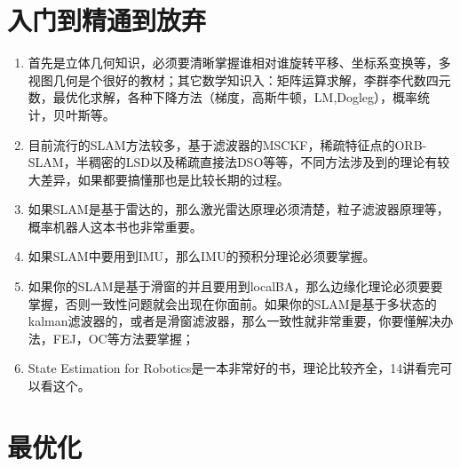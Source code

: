 \documentclass[]{elegantbook}
\author{龚正茂}
\date{\today}
\begin{document}
\maketitle
\tableofcontents  %
\mainmatter  		%


\chapter{入门到精通到放弃}

\begin{enumerate}
	\item 首先是立体几何知识，必须要清晰掌握谁相对谁旋转平移、坐标系变换等，多视图几何是个很好的教材；其它数学知识入：矩阵运算求解，李群李代数四元数，最优化求解，各种下降方法（梯度，高斯牛顿，LM,Dogleg），概率统计，贝叶斯等。
	\item 目前流行的SLAM方法较多，基于滤波器的MSCKF，稀疏特征点的ORB-SLAM，半稠密的LSD以及稀疏直接法DSO等等，不同方法涉及到的理论有较大差异，如果都要搞懂那也是比较长期的过程。
	\item 如果SLAM是基于雷达的，那么激光雷达原理必须清楚，粒子滤波器原理等，概率机器人这本书也非常重要。
	\item 如果SLAM中要用到IMU，那么IMU的预积分理论必须要掌握。
	\item 如果你的SLAM是基于滑窗的并且要用到localBA，那么边缘化理论必须要要掌握，否则一致性问题就会出现在你面前。如果你的SLAM是基于多状态的kalman滤波器的，或者是滑窗滤波器，那么一致性就非常重要，你要懂解决办法，FEJ，OC等方法要掌握；
	\item State Estimation for Robotics是一本非常好的书，理论比较齐全，14讲看完可以看这个。
\end{enumerate}
















\nocite{EINAV2010,Havrylchyk2018} 







\appendix

\chapter{最优化}\label{附录A}
\end{document}
